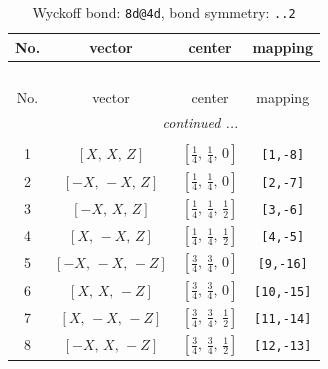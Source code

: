 \documentclass[fleqn,8pt]{jsarticle}
\begin{document}
\renewcommand{\arraystretch}{1.2}
\begin{longtable}{cccc}
\caption{Wyckoff bond: {\tt 8d@4d}, bond symmetry: {\tt ..2}}
 \\
 \hline \hline
No. & vector & center & mapping \\ \hline \endfirsthead

\multicolumn{3}{l}{\tablename\ \thetable{}} \\
 \hline \hline
No. & vector & center & mapping \\ \hline \endhead

 \hline \hline
\multicolumn{3}{r}{\footnotesize\it continued ...} \\ \endfoot

 \hline \hline
\multicolumn{3}{r}{} \\ \endlastfoot

1 & $\left[ X,\, X,\, Z \right]$ & $\left[ \frac{1}{4},\, \frac{1}{4},\, 0 \right]$ & {\tt [1,-8]} \\ \hline
2 & $\left[ - X,\, - X,\, Z \right]$ & $\left[ \frac{1}{4},\, \frac{1}{4},\, 0 \right]$ & {\tt [2,-7]} \\ \hline
3 & $\left[ - X,\, X,\, Z \right]$ & $\left[ \frac{1}{4},\, \frac{1}{4},\, \frac{1}{2} \right]$ & {\tt [3,-6]} \\ \hline
4 & $\left[ X,\, - X,\, Z \right]$ & $\left[ \frac{1}{4},\, \frac{1}{4},\, \frac{1}{2} \right]$ & {\tt [4,-5]} \\ \hline
5 & $\left[ - X,\, - X,\, - Z \right]$ & $\left[ \frac{3}{4},\, \frac{3}{4},\, 0 \right]$ & {\tt [9,-16]} \\ \hline
6 & $\left[ X,\, X,\, - Z \right]$ & $\left[ \frac{3}{4},\, \frac{3}{4},\, 0 \right]$ & {\tt [10,-15]} \\ \hline
7 & $\left[ X,\, - X,\, - Z \right]$ & $\left[ \frac{3}{4},\, \frac{3}{4},\, \frac{1}{2} \right]$ & {\tt [11,-14]} \\ \hline
8 & $\left[ - X,\, X,\, - Z \right]$ & $\left[ \frac{3}{4},\, \frac{3}{4},\, \frac{1}{2} \right]$ & {\tt [12,-13]} \\
\end{longtable}
\renewcommand{\arraystretch}{1.2}
\end{document}
